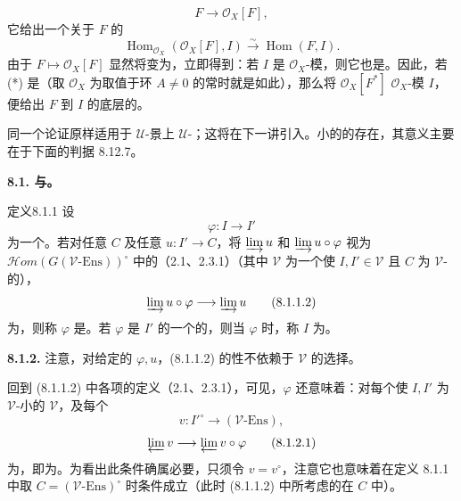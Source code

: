 \[
F\longrightarrow\mathcal O_X[F],\tag{*}
\]
它给出一个关于 $F$ 的
\[
\operatorname{Hom}_{\mathcal O_X}(\mathcal O_X[F],I)
\xrightarrow{\sim}\operatorname{Hom}(F,I).
\]
由于 $F\mapsto\mathcal O_X[F]$ 显然将变为，立即得到：若 $I$ 是 $\mathcal O_X$-模，则它也是。因此，若 (*) 是（取 $\mathcal O_X$ 为取值于环 $A\ne0$ 的常时就是如此），那么将 $\mathcal O_X[F^*]$  $\mathcal O_X$-模 $I$，便给出 $F$ 到 $I$ 的底层的。

同一个论证原样适用于 $\mathcal U$-景上 $\mathcal U$-；这将在下一讲引入。小的的存在，其意义主要在于下面的判据 8.12.7。

\textbf{8.1. 与。}
\begin{SGAresult}{定义}{8.1.1}
设
\[
\varphi:I\longrightarrow I'\tag{8.1.1.1}
\]
为一个。若对任意 $C$ 及任意 $u:I'\to C$，将 $\varinjlim u$ 和 $\varinjlim u\circ\varphi$ 视为 $\mathscr{H}\!om(G(\mathcal V\text{-}\mathrm{Ens}))^\circ$ 中的（2.1、2.3.1）（其中 $\mathcal V$ 为一个使 $I,I'\in\mathcal V$ 且 $C$ 为 $\mathcal V$-的），
\[
\varinjlim u\circ\varphi\longrightarrow\varinjlim u\tag{8.1.1.2}
\]
为，则称 $\varphi$ 是。若 $\varphi$ 是 $I'$ 的一个的，则当 $\varphi$ 时，称 $I$ 为。
\end{SGAresult}
\textbf{8.1.2.} 注意，对给定的 $\varphi,u$，(8.1.1.2) 的性不依赖于 $\mathcal V$ 的选择。

回到 (8.1.1.2) 中各项的定义（2.1、2.3.1），可见，$\varphi$ 还意味着：对每个使 $I,I'$ 为 $\mathcal V$-小的 $\mathcal V$，及每个
\[
v:I'^\circ\longrightarrow(\mathcal V\text{-}\mathrm{Ens}),
\]
\[
\varprojlim v\longrightarrow\varprojlim v\circ\varphi\tag{8.1.2.1}
\]
为，即为。为看出此条件确属必要，只须令 $v=v^\circ$，注意它也意味着在定义 8.1.1 中取 $C=(\mathcal V\text{-}\mathrm{Ens})^\circ$ 时条件成立（此时 (8.1.1.2) 中所考虑的在 $C$ 中）。

